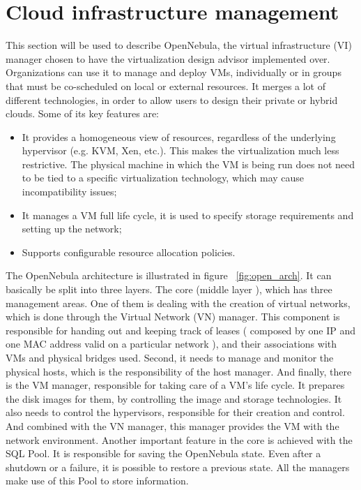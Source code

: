 \documentclass[jidm,a4paper]{jidm} %
\begin{document}
\section{Cloud infrastructure management}
\label{chap:infrastructure}

This section will be used to describe OpenNebula, the virtual infrastructure (VI) manager chosen to have the virtualization design advisor implemented over. Organizations can use it to manage and deploy VMs, individually or in groups that must be co-scheduled on local or external resources. It merges a lot of different technologies, in order to allow users to design their private or hybrid clouds. Some of its key features are:
\begin{itemize}
 \item It provides a homogeneous view of resources, regardless of the underlying hypervisor (e.g. KVM, Xen, etc.). This makes the virtualization much less restrictive. The physical machine in which the VM is being run does not need to be tied to a specific virtualization technology, which may cause incompatibility issues;
  \item It manages a VM full life cycle, it is used to specify storage requirements and setting up the network;
  \item Supports configurable resource allocation policies.
\end{itemize}

The OpenNebula architecture is illustrated in figure ~\ref{fig:open_arch}. It can basically be split into three layers. The core (middle layer ), which has three management areas. One of them is dealing with the creation of virtual networks, which is done through the Virtual Network (VN) manager. This component is responsible for handing out and keeping track of leases ( composed by one IP and one MAC address valid on a particular network ), and their associations with VMs and physical bridges used. Second, it needs to manage and monitor the physical hosts, which is the responsibility of the host manager. And finally, there is the VM manager, responsible for taking care of a VM's life cycle. It prepares the disk images for them, by controlling the image and storage technologies. It also needs to control the hypervisors, responsible for their creation and control. And combined with the VN manager, this manager provides the VM with the network environment. Another important feature in the core is achieved with 
the SQL Pool. It is responsible for saving the OpenNebula state. Even after a shutdown or a failure, it is possible to restore a previous state. All the managers make use of this Pool to store information.
\end{document}
